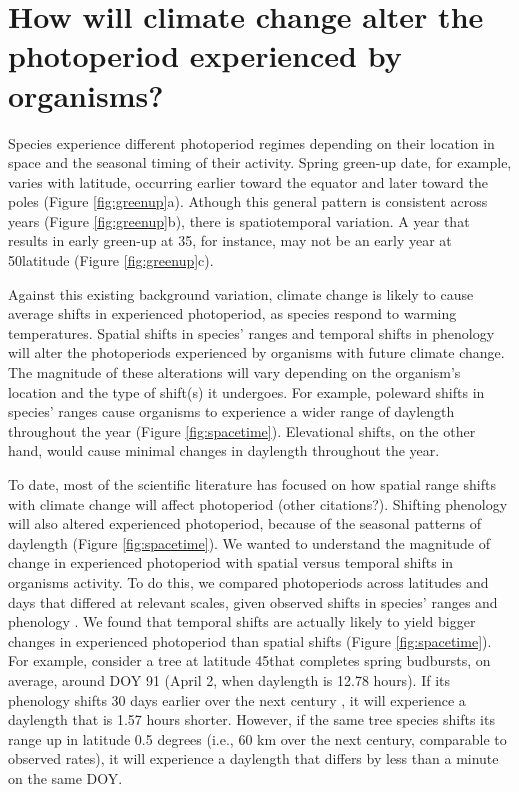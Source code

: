 \documentclass{article}
\begin{document}
\section*{How will climate change alter the photoperiod experienced by organisms?}
\par Species experience different photoperiod regimes depending on their location in space and the seasonal timing of their activity. Spring green-up date, for example, varies with latitude, occurring earlier toward the equator and later toward the poles (Figure \ref{fig:greenup}a). Athough this general pattern is consistent across years (Figure \ref{fig:greenup}b), there is spatiotemporal variation. A year that results in early green-up at 35\degree, for instance, may not be an early year at 50\degree latitude (Figure \ref{fig:greenup}c).
\par Against this existing background variation, climate change is likely to cause average shifts in experienced photoperiod, as species respond to warming temperatures. Spatial shifts in species' ranges and temporal shifts in  phenology will alter the photoperiods experienced by organisms with future climate change. The magnitude of these alterations will vary depending on the organism's location and the type of shift(s) it undergoes. For example, poleward shifts in species' ranges cause organisms to experience a wider range of daylength throughout the year (Figure \ref{fig:spacetime}). Elevational shifts, on the other hand, would cause minimal changes in daylength throughout the year. 
\par To date, most of the scientific literature has focused on how spatial range shifts with climate change will affect photoperiod \citep{saikkonen2012} (other citations?). Shifting phenology will also altered experienced photoperiod, because of the seasonal patterns of daylength (Figure \ref{fig:spacetime}). We wanted to understand the magnitude of change in experienced photoperiod with spatial versus temporal shifts in organisms activity. To do this, we compared photoperiods across latitudes and days that differed at relevant scales, given observed shifts in  species' ranges and phenology \citep{parmesan2003,chen2011}.  We found that temporal shifts are actually likely to yield bigger changes in experienced photoperiod than spatial shifts (Figure \ref{fig:spacetime}). For example, consider a tree at latitude 45\degree  that completes spring budbursts, on average, around DOY 91 (April 2, when daylength is 12.78 hours). If its phenology shifts 30 days earlier over the next century \citep[][i.e., a rate of ~3 days per decade, as has been observed]{parmesan2003}, it will experience a daylength that is 1.57 hours shorter. However, if the same tree species shifts its range up in latitude 0.5 degrees (i.e., 60 km over the next century,  comparable to observed rates\citep{parmesan2003, chen2011}), it will experience a daylength that differs by less than a minute on the same DOY. 
\end{document}
